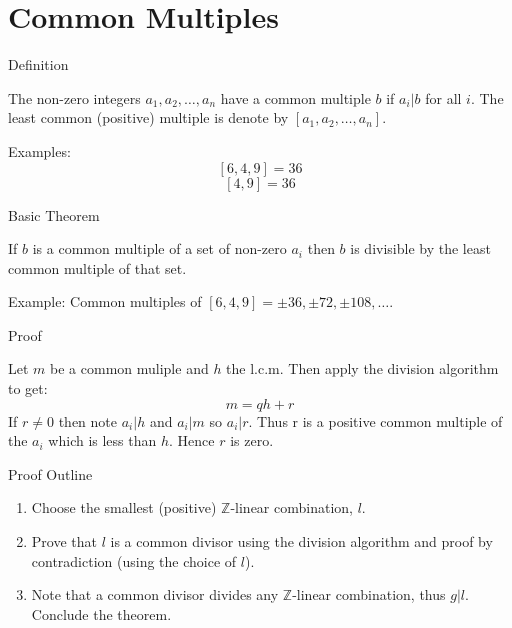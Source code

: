 \documentclass{beamer}
\begin{document}
\section{Common Multiples}
\begin{frame}{Definition}
  \begin{definition}
    The non-zero integers $a_1, a_2, \ldots, a_n$ have a common
    multiple $b$ if $a_i | b$ for all $i$.  The least common
    (positive) multiple is denote by $[a_1, a_2, \ldots, a_n]$.
  \end{definition}

  Examples:
  $$[6, 4, 9] = 36$$
  $$[4, 9] = 36$$

\end{frame}

\begin{frame}{Basic Theorem}

  \begin{theorem}
    If $b$ is a common multiple of a set of non-zero $a_i$ then $b$ is
    divisible by the least common multiple of that set. 
  \end{theorem}
  
  Example: Common multiples of $[6, 4, 9] = \pm 36, \pm 72, \pm 108,
  \ldots$.

\end{frame}

\begin{frame}{Proof}

  Let $m$ be a common muliple and $h$ the l.c.m. Then apply the
  division algorithm to get:
  $$m = qh + r$$
  If $r \ne 0$ then note $a_i | h$ and $a_i | m$ so $a_i | r$. Thus r
  is a positive common multiple of the $a_i$ which is less than $h$. Hence $r$
  is zero.

\end{frame}

\begin{frame}{Proof Outline}
  
  \begin{enumerate}
  \item Choose the smallest (positive) $\mathbb{Z}$-linear
    combination, $l$.
  \item Prove that $l$ is a common divisor using the division
    algorithm and proof by contradiction (using the choice of $l$).
  \item Note that a common divisor divides any $\mathbb{Z}$-linear
    combination, thus $g | l$.  Conclude the theorem.
  \end{enumerate}

\end{frame}
\end{document}
